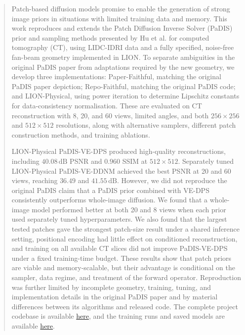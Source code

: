 \begin{abstract}
Patch-based diffusion models promise to enable the generation of strong image priors in situations with limited training data and memory. This work reproduces and extends the Patch Diffusion Inverse Solver (PaDIS) prior and sampling methods presented by Hu et al. for computed tomography (CT), using LIDC-IDRI data and a fully specified, noise-free fan-beam geometry implemented in LION. To separate ambiguities in the original PaDIS paper from adaptations required by the new geometry, we develop three implementations: Paper-Faithful, matching the original PaDIS paper depiction; Repo-Faithful, matching the original PaDIS code; and LION-Physical, using power iteration to determine Lipschitz constants for data-consistency normalisation. These are evaluated on CT reconstruction with 8, 20, and 60 views, limited angles, and both $256\times 256$ and $512\times512$ resolutions, along with alternative samplers, different patch construction methods, and training ablations.

LION-Physical PaDIS-VE-DPS produced high-quality reconstructions, including $40.08\,\mathrm{dB}$ PSNR and $0.960$ SSIM at $512\times512$. Separately tuned LION-Physical PaDIS-VE-DDNM achieved the best PSNR at 20 and 60 views, reaching $36.49$ and $41.55\,\mathrm{dB}$. However, we did not reproduce the original PaDIS claim that a PaDIS prior combined with VE-DPS consistently outperforms whole-image diffusion. We found that a whole-image model performed better at both 20 and 8 views when each prior used separately tuned hyperparameters. We also found that the largest tested patches gave the strongest patch-size result under a shared inference setting, positional encoding had little effect on conditioned reconstruction, and training on all available CT slices did not improve PaDIS-VE-DPS under a fixed training-time budget. These results show that patch priors are viable and memory-scalable, but their advantage is conditional on the sampler, data regime, and treatment of the forward operator. Reproduction was further limited by incomplete geometry, training, tuning, and implementation details in the original PaDIS paper and by material differences between its algorithms and released code. The complete project codebase is available \href{https://github.com/THartigan/MPhil-Project}{here}, and the training runs and saved models are available \href{https://wandb.ai/tjh200-university-of-cambridge/PaDIS-Reproduction?nw=nwusertjh200}{here}.
\end{abstract}
